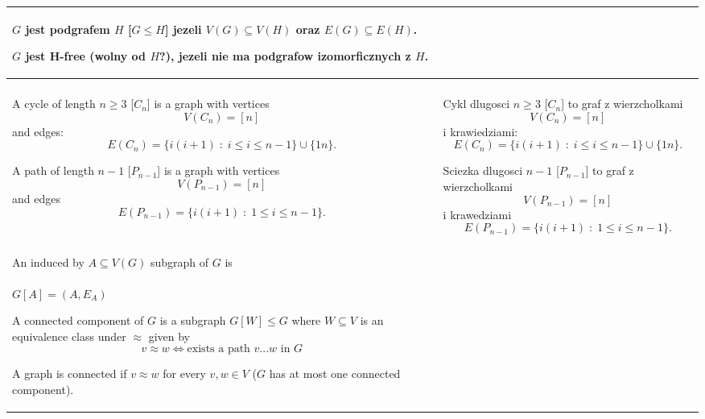 \begin{tabularx}{\textwidth}{ X!{\color{git90gray}\vrule} X }
    $G$ jest {\color{def}podgrafem} $H$ [$G\leq H$] jezeli $V(G)\subseteq V(H)$ oraz $E(G)\subseteq E(H)$.
    \medskip

    $G$ jest {\color{acc}H-free} (wolny od $H$?), jezeli nie ma podgrafow izomorficznych z $H$.
    \medskip

    \\

    \hline

    & \\

    A {\color{def}cycle} of length $n\geq3$ [$C_n$] is a graph with vertices
    $$V(C_n)=[n]$$ 
    and edges:
    $$E(C_n)=\{i(i+1)\;:\;i\leq i\leq n-1\}\cup\{1n\}.$$

    A {\color{def}path} of length $n-1$ [$P_{n-1}$] is a graph with vertices
    $$V(P_{n-1})=[n]$$
    and edges
    $$E(P_{n-1})=\{i(i+1)\;:\;1\leq i\leq n-1\}.$$

    &
    {\color{def}Cykl} dlugosci $n\geq3$ [$C_n$] to graf z wierzcholkami
    $$V(C_n)=[n]$$
    i krawiedziami:
    $$E(C_n)=\{i(i+1)\;:\;i\leq i\leq n-1\}\cup\{1n\}.$$

    {\color{def}Sciezka} dlugosci $n-1$ [$P_{n-1}$] to graf z wierzcholkami
    $$V(P_{n-1})=[n]$$
    i krawedziami
    $$E(P_{n-1})=\{i(i+1)\;:\;1\leq i\leq n-1\}.$$

    \\
    
    \hline

    & \\

    An {\color{def}induced} by $A\subseteq V(G)$ subgraph of $G$ is \\
    $G[A]=(A, E_A)$
    \medskip

    A {\color{acc}connected component} of $G$ is a subgraph $G[W]\leq G$ where $W\subseteq V$ is an equivalence class under $\approx$ given by
    $$v\approx w\iff \text{exists a path } v...w\text{ in }G$$

    A graph is {\color{def}connected} if $v\approx w$ for every $v,w\in V$ ($G$ has at most one connected component).


\end{tabularx}